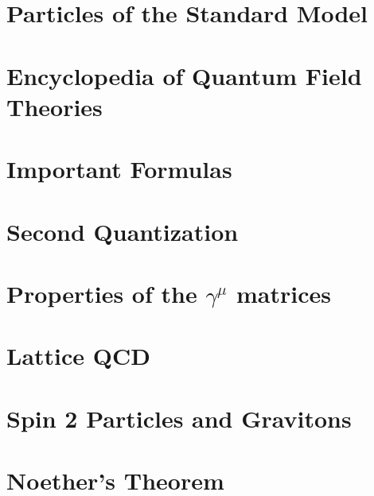 \chapter{Particles of the Standard Model}
\chapter{Encyclopedia of Quantum Field Theories}
\chapter{Important Formulas}
\chapter{Second Quantization}
\chapter{Properties of the $\gamma^\mu$ matrices}
\label{app:gamma}
\chapter{Lattice QCD}
\chapter{Spin 2 Particles and Gravitons}
\chapter{Noether's Theorem}
\label{app:noether}